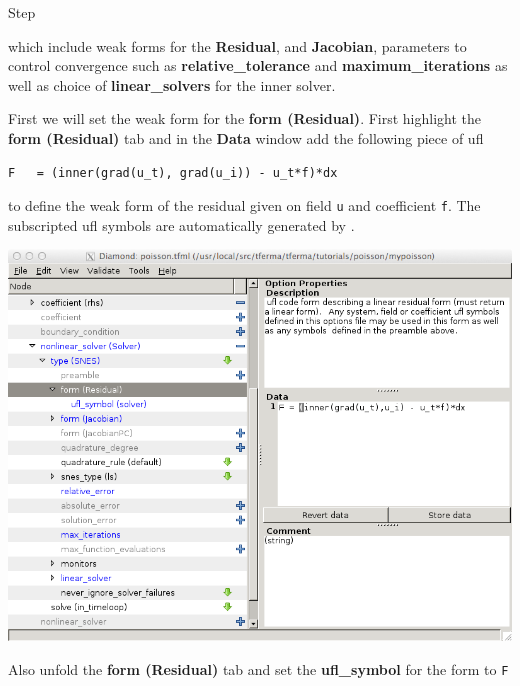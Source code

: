 \begin{steps}{Step}
\begin{center}
\end{center}
which include weak forms for the \textbf{Residual}, and
\textbf{Jacobian}, parameters to control convergence such as
\textbf{relative\_tolerance} and \textbf{maximum\_iterations} as well
as choice of \textbf{linear\_solvers} for the inner solver.

First we will set the weak form for the \textbf{form (Residual)}.
First highlight the  \textbf{form (Residual)} tab and in the
\textbf{Data} window add the following piece of ufl
\begin{lstlisting}[style=ufl]
F   = (inner(grad(u_t), grad(u_i)) - u_t*f)*dx
\end{lstlisting}
to define the weak form of the residual given on field \texttt{u} and
coefficient \texttt{f}.  The subscripted ufl symbols are automatically
generated by \TF{}. 
\begin{center}
    \includegraphics[width=\diamondwidth]{figures/screendumps/diamond_poisson_11c.png}
\end{center}
Also unfold the \textbf{form (Residual)} tab and set the
\textbf{ufl\_symbol} for the form to \texttt{F}


\end{steps}
